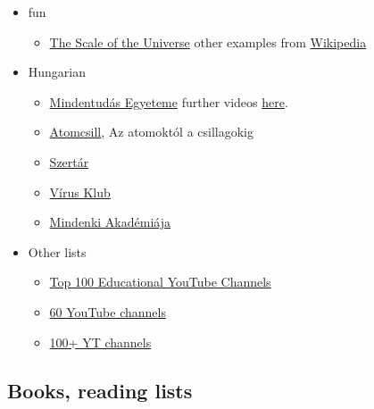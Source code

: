 \documentclass{article}
\begin{document}
\begin{itemize}
    \item fun
    \begin{itemize}
        \item \href{http://htwins.net/scale2/}{The Scale of the Universe} other examples from \href{https://en.wikipedia.org/wiki/Orders_of_magnitude_(length)}{Wikipedia}
    \end{itemize}
    
    \item Hungarian
    \begin{itemize}
        \item \href{https://mindentudas.hu/}{Mindentudás Egyeteme} further videos \href{https://mindentudas.videotorium.hu/hu/channels/1132/mindentudas-egyeteme}{here}.
        \item \href{http://www.atomcsill.elte.hu/}{Atomcsill}, Az atomoktól a csillagokig
        \item \href{http://szertar.com/}{Szertár}
        \item \href{https://www.virusklub.hu/}{Vírus Klub}
        \item \href{https://mediaklikk.hu/musor/mindenki-akademiaja/}{Mindenki Akadémiája}
    \end{itemize}

\item Other lists
\begin{itemize}
    \item \href{https://blog.feedspot.com/educational_youtube_channels/}{Top 100 Educational YouTube Channels}
    \item \href{https://medium.com/the-graph/60-youtube-channels-that-will-make-you-smarter-44d8315c2548}{60 YouTube channels}
    \item \href{https://collegeinfogeek.com/educational-youtube-channels/}{100+ YT channels}
\end{itemize}

\end{itemize}

\subsection{Books, reading lists}
\end{document}
